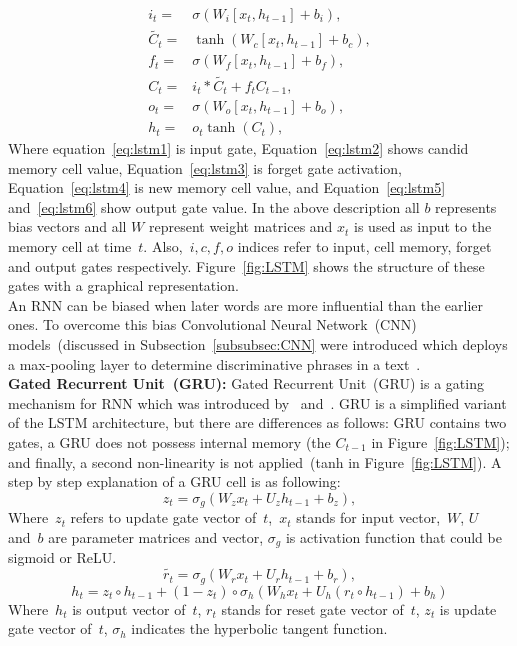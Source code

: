 \documentclass[sigconf, final]{acmart}
\begin{document}
\begin{align}
    &&i_{t}=&\sigma(W_{i}[x_{t},h_{t-1}]+b_{i}),&& \label{eq:lstm1}\\
    &&\tilde{C_{t}}=&\tanh(W_{c}[x_{t},h_{t-1}]+b_{c}),&& \label{eq:lstm2} \\
    &&f_{t}=&\sigma(W_{f}[x_{t},h_{t-1}]+b_{f}),&& \label{eq:lstm3}\\
    &&C_{t}=&  i_{t}* \tilde{C_{t}}+f_{t} C_{t-1},&& \label{eq:lstm4}\\
    &&o_{t}=& \sigma(W_{o}[x_{t},h_{t-1}]+b_{o}),&& \label{eq:lstm5}\\
    &&h_{t}=&o_{t}\tanh(C_{t}),&&\label{eq:lstm6}
\end{align}
Where equation~\ref{eq:lstm1} is input gate, Equation~\ref{eq:lstm2} shows candid memory cell value, Equation~\ref{eq:lstm3} is forget gate activation, Equation~\ref{eq:lstm4} is new memory cell value, and  Equation~\ref{eq:lstm5} and~\ref{eq:lstm6} show output gate value. In the above description all $b$ represents bias vectors and all $W$ represent weight matrices and $x_{t}$ is used as input to the memory cell at time~$t$. Also,~$i,c,f,o$ indices refer to input, cell memory, forget and output gates respectively.
 Figure~\ref{fig:LSTM} shows the structure of these gates with a graphical representation.\\
An RNN can be biased when later words are more influential than the earlier ones. To overcome this bias Convolutional Neural Network~(CNN)  models~(discussed in Subsection~\ref{subsubsec:CNN} were introduced which deploys a max-pooling layer to determine discriminative phrases in a text~\cite{lai2015recurrent}.\\




\textbf{Gated Recurrent Unit~(GRU):}\label{subsec:GRU}
Gated Recurrent Unit~(GRU) is a gating mechanism for RNN which was introduced by~\cite{chung2014empirical} and~\cite{cho2014learning}. GRU is a simplified variant of the
LSTM architecture, but there are differences as follows: GRU contains two gates, a GRU does not possess internal memory (the $C_{t-1}$ in Figure~\ref{fig:LSTM}); and finally, a second non-linearity is not applied~(tanh in Figure~\ref{fig:LSTM}). A step by step explanation of a GRU cell is as following:
\begin{equation}
z_{t}=\sigma_g(W_{z}x_{t}+U_zh_{t-1}+b_{z}), \label{eq:gru1}
\end{equation}
Where~$z_t$ refers to update gate vector of~$t$,~$x_t$ stands for input vector,~$W$, $U$ and~$b$ are parameter matrices and vector, $\sigma_g$ is activation function that could be sigmoid or ReLU.
\begin{equation}
    \tilde{r_{t}}=\sigma_g(W_{r}x_{t}+U_rh_{t-1}+b_{r}), \label{eq:gru2}
\end{equation}
\begin{equation}
   h_t =  z_t \circ h_{t-1} + (1-z_t) \circ \sigma_h(W_{h} x_t + U_{h} (r_t \circ h_{t-1}) + b_h)\label{eq:gru6}
\end{equation}
Where~$h_t$ is output vector of~$t$, $r_t$ stands for reset gate vector of~$t$, $z_t$ is update gate vector of~$t$, $\sigma_h$ indicates the hyperbolic tangent function.
\end{document}
